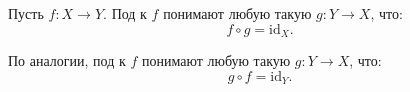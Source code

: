 \begin{definition*}
    Пусть $f\colon X \rightarrow Y$. Под  к $f$ понимают любую такую $g\colon Y
    \rightarrow X$, что:
    $$
        f \circ g = \mathrm{id}_X.
    $$

    По аналогии, под  к $f$ понимают любую такую $g\colon Y \rightarrow X$, что:
    $$
        g \circ f = \mathrm{id}_Y.
    $$
\end{definition*}





